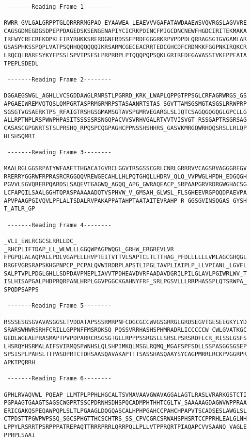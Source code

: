 \begin{lstlisting}
 -------Reading Frame 1--------

RWRR_GVLGALGRPPTGLQRRRRMGPAQ_EYAAWEA_LEAEVVVGAFATAWDAAEWSVQVRGSLAGVVRE
CAGSGDMEGDGSDPEPPDAGEDSKSENGENAPIYCICRKPDINCFMIGCDNCNEWFHGDCIRITEKMAKA
IREWYCRECREKDPKLEIRYRHKKSRERDGNERDSSEPRDEGGGRKRPVPDPDLQRRAGSGTGVGAMLAR
GSASPHKSSPQPLVATPSQHHQQQQQQIKRSARMCGECEACRRTEDCGHCDFCRDMKKFGGPNKIRQKCR
LRQCQLRARESYKYFPSSLSPVTPSESLPRPRRPLPTQQQPQPSQKLGRIREDEGAVASSTVKEPPEATA
TPEPLSDEDL

 -------Reading Frame 2--------

DGGAEGSWGL_AGHLLVCSGDDAWGLRNRSTLPGRRD_KRK_LWAPLQPPGTPPSGLCRFAGRWRGS_GS
APGAEIWREMVQTQSLQMPGRTASPRMGRMRPSTASAANRTSTAS_SGVTTAMSGSMGTASGSLRRWPRP
SGSGTVGSAERKTPS_RFAIGTRSHGSGMAMSGTAVSPGMRVEGARGLSLIQTCSAGQGQGQGLGPCLLG
ALLRPTNPLRSPWWPHPASITSSSSSRSNGQPACVVSVRHVGALRTVVTVISVGT_RSSGAPTRSGRSAG
CASASCGPGNRTSTSLPRSHQ_RPQSPCQGPAGHCPPNSSHSHHRS_GASVKMRGQWRHQQSRSLLRLQP
HLSHSQMRT

 -------Reading Frame 3--------

MAALRGLGGSRPATYWFAAETTHGACAIGVRCLGGVTRSGSSCGRLCNRLGRRRVVCAGSRVAGGGREGV
RRERRYGGRWFRPRASRCRGGQQVREWGECAHLLHLPQTGHQLLHDRV_QLQ_VVPWGLHPDH_EDGQGH
PGVVLSGVQRERPQARDSLSAQEVTGAGWQ_AGQQ_APG_GWRAQEACP_SRPAAPGRVRDRGWGHACSG
LCFAPQILSAALGGHTQPASPAAAAADQTVSPHVW_V_GMSAH_GLWSL_FLSGHEEVRGPQQDPAEVPA
APVPAAGPGIVQVLPFLALTSDALRVPAKAPPATAHPTAATAITEVRAHP_R_GGSGVINSQGAS_GYSH
T_ATLR_GP

 -------Reading Frame 4--------

_VLI_EWLRCGCSLRRLLDC_  _RHCPLIFTDAP_LL_WLWLLLGGQWPAGPWQGL_GRHW_ERGREVLVR
FPGPQLALAQPALLPDLVGAPELLHVPTEITVTTVLSAPTCLTLTTHAG_PFDLLLLLLVMLAGCGHQGL
RRGFVGRSRAPSKHGPNPCP_PCPALQVWIRDRPLAPSTLIPGLTAVPLIAIPLP_LLVPIANL_LGVFL
SALPTVPLPDGLGHLLSDPDAVPMEPLIAVVTPDHEAVDVRFAADAVDGRILPILGLAVLPGIWRLWV_T
ISLHISAPGALPHDPRQRPANLHRPLGGVPGGCKGAHNYFRF_SRLPGSVLLLRRPHASSPLQTSRWPA_
SPQDPSAPPS

 -------Reading Frame 5--------

RSSSESGSGVAVASGGSLTVDDATAPSSSRMRPNFCDGCGCCWVGSGRRGLGRDSEGVTGESEEGKYLYD
SRARSWHWRSRHFCRILLGPPNFFMSRQKSQ_PQSSVRRHASHSPHMRADRLICCCCCW_CWLGVATKGC
GEDLWGEAEPRASMAPTPVPDPARRCRSGSGTGLLRPPPSSRGSLLSRSLPSRSRDFLCR_RISSLGSFS
LHSRQYHSRMALAIFSVIRMQSPWNHSLQLSHPIMKQLMSGLRQMQ_MGAFSPFSDLLSSPASGGSGSEP
SPSISPLPAHSLTTPASDPRTCTDHSAASQAVAKAPTTTSASSHASQAAYSYCAGPMRRLRCKPVGGRPR
APKTPQRRH

 -------Reading Frame 6--------

GPHLRVAQVWL_PQEAP_LLMTPLPPHLHGCALTSVMAVAAVGWAVAGGALAGTLRASLVRARKGSTCTI
PGPAAGTGAAGTSAGSCWGPRTSSCPDRNHSDHSPQCADMPHTHHTCGLTV_SAAAAAGDAGWVWPPRAA
ERICGAKQSPEQAWPQPLSLTLPGAAGLDQGQASCALHPHPGAHCCPAHCHPAPVTSCADSESLAWGLSL
CTPDSTTPGWPWPSSQ_SGCSPHGTTHCSCHTRS_SS_CPVCGRCSRWAHSPHSRTCCPPRHLEALGLNH
LPPYLRSRRTPSRPPPATREPAQTTRRRPRRLQRRPQLLPLLVTPPRQRTPIAQAPCVVSAANQ_VAGLE
PPRPLSAAI
\end{lstlisting}

